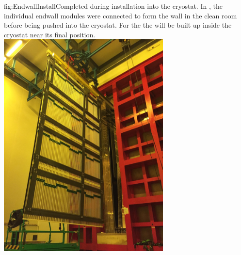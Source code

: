 \begin{dunefigure}{fig:EndwallInstall}{Completed  during installation into the  cryostat. In
, the individual endwall modules were connected to form the wall in the clean room before being pushed into the cryostat. 
For the  the  will be built up inside the cryostat near its final position.}
\includegraphics[width=0.65\textwidth]{graphics/endwall_and_tco.jpg}
\end{dunefigure}

